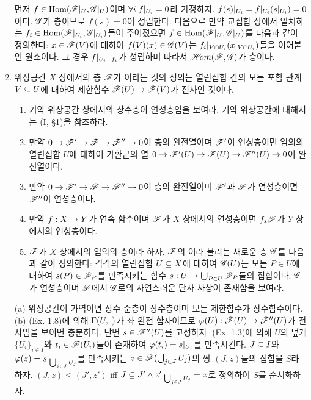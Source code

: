 \begin{enumerate}[label=\tb{1.\arabic*.},itemindent=0mm,itemsep=4mm]
	먼저 $f\in\operatorname{Hom}(\mathscr{F}|_U,\mathscr{G}|_U)$이며 $\forall i\;f|_{U_i}=0$라 가정하자.
	$f(s)|_{U_i}=f|_{U_i}(s|_{U_i})=0$이다. $\mathscr{G}$가 층이므로 $f(s)=0$이 성립한다.
	다음으로 만약 교집합 상에서 일치하는 $f_i\in\operatorname{Hom}(\mathscr{F}|_{U_i},\mathscr{G}|_{U_i})$들이 주어졌으면
	$f\in\operatorname{Hom}(\mathscr{F}|_U,\mathscr{G}|_U)$를 다음과 같이 정의한다:
	$x\in\mathscr{F}(V)$에 대하여 $f(V)(x)\in\mathscr{G}(V)$는 $f_i|_{V\cap U_i}(x|_{V\cap U_i})$들을 이어붙인 원소이다.
	그 경우 $f|_{U_i=f_i}$가 성립하며 따라서 $\mathscr{H}\!om(\mathscr{F},\mathscr{G})$가 층이다.
	\item {} 위상공간 $X$ 상에서의 층 $\mathscr{F}$가 이라는 것의 정의는
	열린집합 간의 모든 포함 관계 $V\subseteq U$에 대하여 제한함수 $\mathscr{F}(U)\rightarrow\mathscr{F}(V)$가 전사인 것이다.
	\begin{enumerate}[label=(\alph*)]
	\item 기약 위상공간 상에서의 상수층이 연성층임을 보여라. 기약 위상공간에 대해서는 (I, \S 1)을 참조하라.
	\item 만약 $0\rightarrow\mathscr{F}'\rightarrow\mathscr{F}\rightarrow\mathscr{F}''\rightarrow 0$이 층의 완전열이며 $\mathscr{F}'$이 연성층이면 임의의 열린집합 $U$에 대하여
	가환군의 열 $0\rightarrow\mathscr{F}'(U)\rightarrow\mathscr{F}(U)\rightarrow\mathscr{F}''(U)\rightarrow 0$이 완전열이다.
	\item 만약 $0\rightarrow\mathscr{F}'\rightarrow\mathscr{F}\rightarrow\mathscr{F}''\rightarrow 0$이 층의 완전열이며 $\mathscr{F}'$과 $\mathscr{F}$가 연성층이면 $\mathscr{F}''$이 연성층이다.
	\item 만약 $f:X\rightarrow Y$가 연속 함수이며 $\mathscr{F}$가 $X$ 상에서의 연성층이면 $f_*\mathscr{F}$가 $Y$ 상에서의 연성층이다.
	\item $\mathscr{F}$가 $X$ 상에서의 임의의 층이라 하자.
	$\mathscr{F}$의 이라 불리는 새로운 층 $\mathscr{G}$를 다음과 같이 정의한다:
	각각의 열린집합 $U\subseteq X$에 대하여 $\mathscr{G}(U)$는 모든 $P\in U$에 대하여 $s(P)\in\mathscr{F}_P$를 만족시키는
	함수 $s:U\rightarrow\bigcup_{P\in U}\mathscr{F}_P$들의 집합이다.
	$\mathscr{G}$가 연성층이며 $\mathscr{F}$에서 $\mathscr{G}$로의 자연스러운 단사 사상이 존재함을 보여라.
	\end{enumerate}
	\sol (a) 위상공간이 가역이면 상수 준층이 상수층이며 모든 제한함수가 상수함수이다.\\
	(b) (Ex. 1.8)에 의해 $\Gamma(U,\cdot)$가 좌 완전 함자이므로 $\varphi(U):\mathscr{F}(U)\rightarrow\mathscr{F}''(U)$가 전사임을 보이면 충분하다.
	단면 $s\in\mathscr{F}''(U)$를 고정하자. (Ex. 1.3)에 의해 $U$의 덮개 $\{U_i\}_{i\in I}$와
	$t_i\in\mathscr{F}(U_i)$들이 존재하여 $\varphi(t_i)=s|_{U_i}$를 만족시킨다.
	$J\subseteq I$와 $\varphi(z)=s|_{\bigcup_{j\in J}U_j}$를 만족시키는
	$z\in\mathscr{F}(\bigcup_{j\in J}U_j)$의 쌍 $(J,z)$들의 집합을 $S$라 하자.
	$(J,z)\le(J',z')$ iff $J\subseteq J'\wedge z'|_{\bigcup_{j\in J}U_j}=z$로 정의하여 $S$를 순서화하자.

\end{enumerate}
